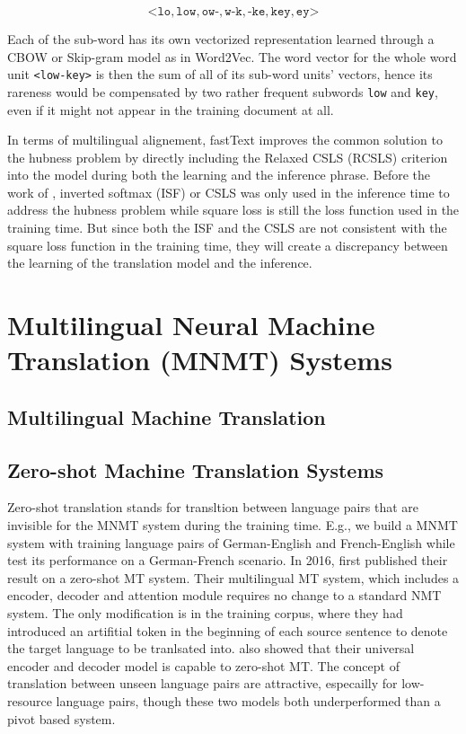 \documentclass[thesis,fonts=libertine]{cluu}
\begin{document}
\begin{equation*}
  \mathtt{\text{<}lo, low, ow\text{-}, w\text{-}k, \text{-}ke, key, ey\text{>}}
\end{equation*}

Each of the sub-word has its own vectorized representation learned through a CBOW or Skip-gram model as in Word2Vec. The word vector for the whole word unit \texttt{<low-key>} is then the sum of all of its sub-word units' vectors, hence its rareness would be compensated by two rather frequent subwords \texttt{low} and \texttt{key}, even if it might not appear in the training document at all.

In terms of multilingual alignement, fastText improves the common solution to the hubness problem by directly including the Relaxed CSLS (RCSLS) criterion into the model during both the learning and the inference phrase. Before the work of \cite{Joulin:2018aa}, inverted softmax (ISF) \cite{Smith:2017aa} or CSLS \parencite{Conneau:2017aa} was only used in the inference time to address the hubness problem while square loss is still the loss function used in the training time. But since both the ISF and the CSLS are not consistent with the square loss function in the training time, they will create a discrepancy between the learning of the translation model and the inference.

\section{Multilingual Neural Machine Translation (MNMT) Systems}

\subsection{Multilingual Machine Translation}

\subsection{Zero-shot Machine Translation Systems}

Zero-shot translation stands for transltion between language pairs that are invisible for the MNMT system during the training time. E.g., we build a MNMT system with training language pairs of German-English and French-English while test its performance on a German-French scenario. In 2016, \cite{Johnson:2016aa} first published their result on a zero-shot MT system. Their multilingual MT system, which includes a encoder, decoder and attention module requires no change to a standard NMT system. The only modification is in the training corpus, where they had introduced an artifitial token in the beginning of each source sentence to denote the target language to be tranlsated into. \cite{Ha:2016aa} also showed that their universal encoder and decoder model is capable to zero-shot MT. The concept of translation between unseen language pairs are attractive, especailly for low-resource language pairs, though these two models both underperformed than a pivot based system.
\end{document}
